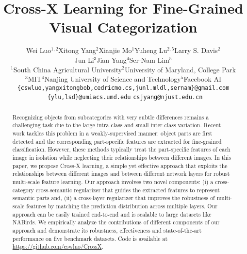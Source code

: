 \documentclass[10pt,twocolumn,letterpaper]{article}
\begin{document}
\title{Cross-X Learning for Fine-Grained Visual Categorization}

\author{Wei Luo$^{1,2}$\quad Xitong Yang$^2$\quad Xianjie Mo$^1$\quad Yuheng Lu$^{2,5}$\quad Larry S. Davis$^2$\\ Jun Li$^3$\quad Jian Yang$^4$\quad Ser-Nam Lim$^5$\\
$^1$South China Agricultural University\quad $^2$University of Maryland, College Park\\
$^3$MIT\quad $^4$Nanjing University of Science and Technology\quad $^5$Facebook AI\\
{\tt\small \{cswluo,yangxitongbob,cedricmo.cs,junl.mldl,sernam\}@gmail.com}\\\
{\tt\small \{ylu,lsd\}@umiacs.umd.edu}\quad
{\tt\small csjyang@njust.edu.cn}
}

\maketitle
\ificcvfinal\thispagestyle{empty}\fi

\begin{abstract}
Recognizing objects from subcategories with very subtle differences remains a challenging task due to the large intra-class and small inter-class variation.
Recent work tackles this problem in a weakly-supervised manner: object parts are first detected and the corresponding part-specific features are extracted for fine-grained classification.
However, these methods typically treat the part-specific features of each image in isolation while neglecting their relationships between different images.
In this paper, we propose Cross-X learning, a simple yet effective approach that exploits the relationships between different images and between different network layers for robust multi-scale feature learning.
Our approach involves two novel components: (i) a cross-category cross-semantic regularizer that guides the extracted features to represent semantic parts and, (ii) a cross-layer regularizer that improves the robustness of multi-scale features by matching the prediction distribution across multiple layers.
Our approach can be easily trained end-to-end and is scalable to large datasets like NABirds.
We empirically analyze the contributions of different components of our approach and  demonstrate  its  robustness, effectiveness  and state-of-the-art performance on five benchmark datasets.
Code is available at \url{https://github.com/cswluo/CrossX}.
\end{abstract}
\end{document}
